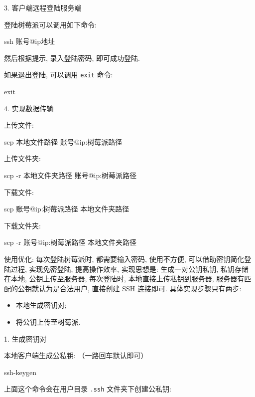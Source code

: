 \documentclass[openany, fontset=windowsold]{ctexbook}
\theoremstyle{kaiti}
\theoremstyle{normal}
\begin{document}
3. 客户端远程登陆服务端

登陆树莓派可以调用如下命令:

\begin{bash}
  ssh 账号@ip地址
\end{bash}

然后根据提示, 录入登陆密码, 即可成功登陆.

如果退出登陆, 可以调用 \verb|exit| 命令:

\begin{bash}
  exit
\end{bash}

4. 实现数据传输

上传文件:

\begin{bash}
  scp 本地文件路径 账号@ip:树莓派路径
\end{bash}

上传文件夹:

\begin{bash}
  scp -r 本地文件夹路径 账号@ip:树莓派路径
\end{bash}

下载文件:

\begin{bash}
  scp 账号@ip:树莓派路径 本地文件夹路径
\end{bash}

下载文件夹:

\begin{bash}
  scp -r 账号@ip:树莓派路径 本地文件夹路径
\end{bash}

使用优化: 每次登陆树莓派时, 都需要输入密码, 使用不方便, 可以借助密钥简化登陆过程, 实现免密登陆, 提高操作效率, 实现思想是: 生成一对公钥私钥, 私钥存储在本地, 公钥上传至服务器, 每次登陆时, 本地直接上传私钥到服务器, 服务器有匹配的公钥就认为是合法用户, 直接创建 SSH 连接即可. 具体实现步骤只有两步:

\begin{itemize}
  \item 本地生成密钥对;
  \item 将公钥上传至树莓派.
\end{itemize}

1. 生成密钥对

本地客户端生成公私钥: （一路回车默认即可）

\begin{bash}
  ssh-keygen
\end{bash}

上面这个命令会在用户目录 \verb|.ssh| 文件夹下创建公私钥:
\end{document}
